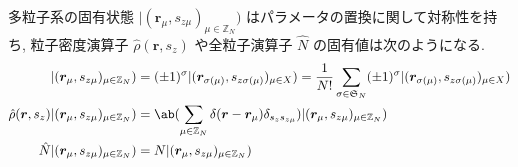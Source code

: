 \documentclass[uplatex,dvipdfmx,a4paper,11pt]{jlreq}
\newcommand{\ZZ}{\mathbb{Z}}
\renewcommand{\SS}{\mathfrak{S}}
\newcommand{\rr}{\bm{r}}
\numberwithin{equation}{section}
\theoremstyle{definition}
\begin{document}
\begin{theorem}[Q21-86(i)(iv)(v)(vi)]
  多粒子系の固有状態 $|(\rr_{\mu}, s_{z\mu})_{\mu\in\ZZ_N})$ はパラメータの置換に関して対称性を持ち, 粒子密度演算子 $\hat{\rho}(\rr, s_z)$ や全粒子演算子 $\hat{N}$ の固有値は次のようになる.
  \begin{align}
    |(\rr_{\mu}, s_{z\mu})_{\mu\in\ZZ_N})                   & = (\pm 1)^\sigma|(\rr_{\sigma(\mu)}, s_{z\sigma(\mu)})_{\mu\in X}) = \frac{1}{N!}\sum_{\sigma\in\SS_N}(\pm 1)^\sigma|(\rr_{\sigma(\mu)}, s_{z\sigma(\mu)})_{\mu\in X}) \\
    \hat{\rho}(\rr, s_z)|(\rr_\mu, s_{z\mu})_{\mu\in\ZZ_N}) & = \ab(\sum_{\mu\in\ZZ_N}\delta(\rr - \rr_\mu)\delta_{s_zs_{z\mu}})|(\rr_\mu, s_{z\mu})_{\mu\in\ZZ_N})                                                                  \\
    \hat{N}|(\rr_\mu, s_{z\mu})_{\mu\in\ZZ_N})              & = N|(\rr_\mu, s_{z\mu})_{\mu\in\ZZ_N})
  \end{align}
\end{theorem}
\end{document}
